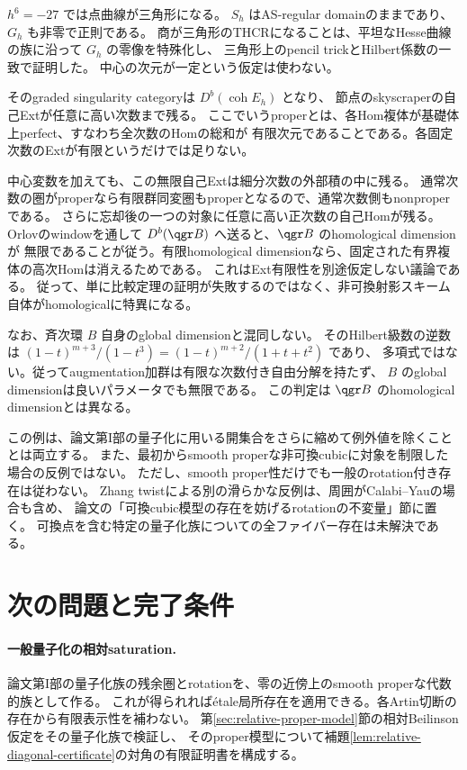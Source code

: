 \(h^6=-27\) では点曲線が三角形になる。
\(S_h\) はAS-regular domainのままであり、\(G_h\) も非零で正則である。
商が三角形のTHCRになることは、平坦なHesse曲線の族に沿って \(G_h\) の零像を特殊化し、
三角形上のpencil trickとHilbert係数の一致で証明した。
中心の次元が一定という仮定は使わない。

そのgraded singularity categoryは \(D^b(\operatorname{coh}E_h)\) となり、
節点のskyscraperの自己Extが任意に高い次数まで残る。
ここでいうproperとは、各Hom複体が基礎体上perfect、すなわち全次数のHomの総和が
有限次元であることである。各固定次数のExtが有限というだけでは足りない。

中心変数を加えても、この無限自己Extは細分次数の外部積の中に残る。
通常次数の圏がproperなら有限群同変圏もproperとなるので、通常次数側もnonproperである。
さらに忘却後の一つの対象に任意に高い正次数の自己Homが残る。
Orlovのwindowを通して \(D^b(\qgr B)\) へ送ると、\(\qgr B\) のhomological dimensionが
無限であることが従う。有限homological dimensionなら、固定された有界複体の高次Homは消えるためである。
これはExt有限性を別途仮定しない議論である。
従って、単に比較定理の証明が失敗するのではなく、非可換射影スキーム自体がhomologicalに特異になる。

なお、斉次環 \(B\) 自身のglobal dimensionと混同しない。
そのHilbert級数の逆数は \((1-t)^{m+3}/(1-t^3)=(1-t)^{m+2}/(1+t+t^2)\) であり、
多項式ではない。従ってaugmentation加群は有限な次数付き自由分解を持たず、
\(B\) のglobal dimensionは良いパラメータでも無限である。
この判定は \(\qgr B\) のhomological dimensionとは異なる。

この例は、論文第I部の量子化に用いる開集合をさらに縮めて例外値を除くこととは両立する。
また、最初からsmooth properな非可換cubicに対象を制限した場合の反例ではない。
ただし、smooth proper性だけでも一般のrotation付き存在は従わない。
Zhang twistによる別の滑らかな反例は、周囲がCalabi--Yauの場合も含め、
論文の「可換cubic模型の存在を妨げるrotationの不変量」節に置く。
可換点を含む特定の量子化族についての全ファイバー存在は未解決である。

\section{次の問題と完了条件}

\paragraph{一般量子化の相対saturation.}
論文第I部の量子化族の残余圏とrotationを、零の近傍上のsmooth properな代数的族として作る。
これが得られればétale局所存在を適用できる。各Artin切断の存在から有限表示性を補わない。
第\ref{sec:relative-proper-model}節の相対Beilinson仮定をその量子化族で検証し、
そのproper模型について補題\ref{lem:relative-diagonal-certificate}の対角の有限証明書を構成する。

